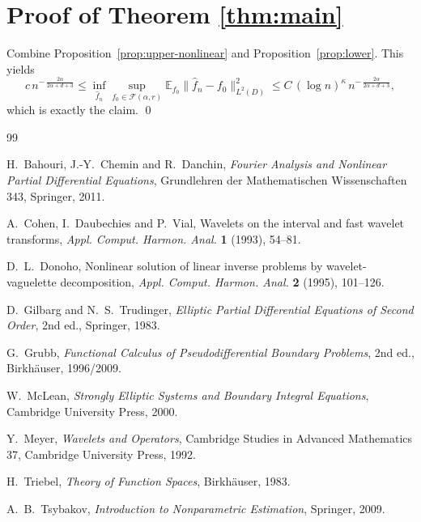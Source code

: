 \documentclass[11pt]{article}
\newcommand{\E}{\mathbb E}
\begin{document}
\section{Proof of Theorem \ref{thm:main}}

Combine Proposition~\ref{prop:upper-nonlinear} and Proposition~\ref{prop:lower}. This yields
\[
c\, n^{-\,\frac{2\alpha}{2\alpha+d+3}}
\le
\inf_{\hat f_n}\sup_{f_0\in \mathcal F(\alpha,r)}
\E_{f_0}\|\hat f_n-f_0\|_{L^2(D)}^2
\le
C\,(\log n)^\kappa\, n^{-\,\frac{2\alpha}{2\alpha+d+3}},
\]
which is exactly the claim.
\qed

\begin{thebibliography}{99}

H.~Bahouri, J.-Y.~Chemin and R.~Danchin,
\emph{Fourier Analysis and Nonlinear Partial Differential Equations},
Grundlehren der Mathematischen Wissenschaften 343, Springer, 2011.

A.~Cohen, I.~Daubechies and P.~Vial,
Wavelets on the interval and fast wavelet transforms,
\emph{Appl. Comput. Harmon. Anal.} \textbf{1} (1993), 54--81.

D.~L.~Donoho,
Nonlinear solution of linear inverse problems by wavelet-vaguelette decomposition,
\emph{Appl. Comput. Harmon. Anal.} \textbf{2} (1995), 101--126.

D.~Gilbarg and N.~S.~Trudinger,
\emph{Elliptic Partial Differential Equations of Second Order},
2nd ed., Springer, 1983.

G.~Grubb,
\emph{Functional Calculus of Pseudodifferential Boundary Problems},
2nd ed., Birkh\"auser, 1996/2009.

W.~McLean,
\emph{Strongly Elliptic Systems and Boundary Integral Equations},
Cambridge University Press, 2000.

Y.~Meyer,
\emph{Wavelets and Operators},
Cambridge Studies in Advanced Mathematics 37, Cambridge University Press, 1992.

H.~Triebel,
\emph{Theory of Function Spaces},
Birkh\"auser, 1983.

A.~B.~Tsybakov,
\emph{Introduction to Nonparametric Estimation},
Springer, 2009.

\end{thebibliography}
\end{document}
